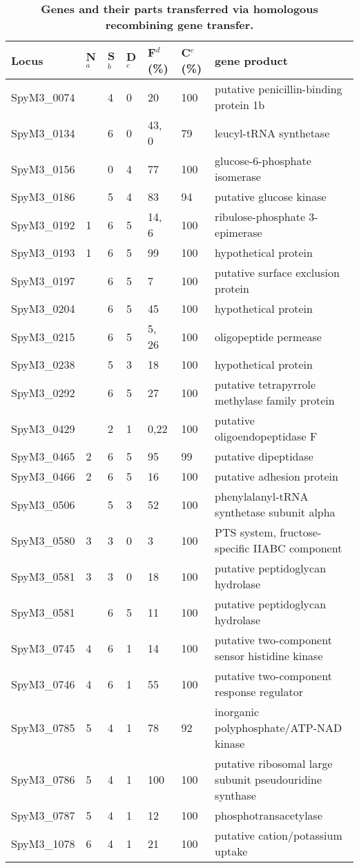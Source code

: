 \documentclass[10pt]{article}
\providecommand{\tabularnewline}{\\}
\begin{document}
\begin{table}[!ht]
\caption{
{\bf Genes and their parts transferred via homologous
recombining gene transfer.}}
{\footnotesize
\begin{tabular}{lllllll}
\hline 
Locus  & N$^a$  & S$^b$  & D$^c$ & F$^d$(\%)  & C$^e$(\%)  & gene 
product\tabularnewline
\hline 
SpyM3\_0074  &  & 4  & 0  & 20  & 100  & putative penicillin-binding protein 1b 
\tabularnewline
SpyM3\_0134  &  & 6  & 0  & 43, 0 & 79  & leucyl-tRNA synthetase \tabularnewline
SpyM3\_0156  &  & 0  & 4  & 77  & 100  & glucose-6-phosphate isomerase 
\tabularnewline
SpyM3\_0186  &  & 5  & 4  & 83  & 94  & putative glucose kinase \tabularnewline
SpyM3\_0192  & 1 & 6  & 5  & 14, 6 & 100  & ribulose-phosphate 3-epimerase 
\tabularnewline
SpyM3\_0193  & 1 & 6  & 5  & 99  & 100  & hypothetical protein\tabularnewline
SpyM3\_0197  &  & 6  & 5  & 7  & 100  & putative surface exclusion 
protein\tabularnewline
SpyM3\_0204  &  & 6  & 5  & 45  & 100  & hypothetical protein \tabularnewline
SpyM3\_0215  &  & 6  & 5  & 5, 26 & 100  & oligopeptide permease \tabularnewline
SpyM3\_0238  &  & 5  & 3  & 18  & 100  & hypothetical protein \tabularnewline
SpyM3\_0292  &  & 6  & 5  & 27  & 100  & putative tetrapyrrole methylase family 
protein \tabularnewline
SpyM3\_0429  &  & 2  & 1  & 0,22  & 100  & putative oligoendopeptidase 
F\tabularnewline
SpyM3\_0465  & 2 & 6  & 5  & 95  & 99  & putative dipeptidase \tabularnewline
SpyM3\_0466  & 2 & 6  & 5  & 16  & 100  & putative adhesion protein 
\tabularnewline
SpyM3\_0506  &  & 5  & 3  & 52  & 100  & phenylalanyl-tRNA synthetase subunit 
alpha \tabularnewline
SpyM3\_0580  & 3 & 3  & 0  & 3  & 100  & PTS system, fructose-specific IIABC 
component\tabularnewline
SpyM3\_0581  & 3 & 3  & 0  & 18  & 100  & putative peptidoglycan hydrolase 
\tabularnewline
SpyM3\_0581  &  & 6  & 5  & 11  & 100  & putative peptidoglycan hydrolase 
\tabularnewline
SpyM3\_0745  & 4 & 6  & 1  & 14  & 100  & putative two-component sensor 
histidine kinase \tabularnewline
SpyM3\_0746  & 4 & 6  & 1  & 55  & 100  & putative two-component response 
regulator \tabularnewline
SpyM3\_0785  & 5 & 4  & 1  & 78  & 92  & inorganic polyphosphate/ATP-NAD 
kinase\tabularnewline
SpyM3\_0786  & 5 & 4  & 1  & 100  & 100  & putative ribosomal large subunit 
pseudouridine synthase \tabularnewline
SpyM3\_0787  & 5 & 4  & 1  & 12  & 100  & phosphotransacetylase \tabularnewline
SpyM3\_1078  & 6 & 4  & 1  & 21  & 100  & putative cation/potassium uptake 

\end{tabular}}
\end{table}
\end{document}
